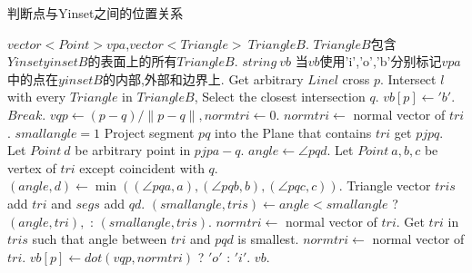 \documentclass[a4paper]{book}
\renewcommand{\algorithmicrequire}{\textbf{输入:}}
\renewcommand{\algorithmicensure}{\textbf{输出:}}
\renewcommand{\algorithmicrequire}{\textbf{Input : }}
\renewcommand{\algorithmicrequire}{\textbf{Precondition : }}
\renewcommand{\algorithmicensure}{\textbf{Output : }}
\renewcommand{\algorithmicensure}{\textbf{Postcondition : }}
\numberwithin{equation}{chapter}
\theoremstyle{definition}
\begin{document}
\begin{algorithm}
	\caption{判断点与Yinset之间的位置关系}
	\begin{algorithmic}[1]
		\renewcommand{\algorithmicrequire}{\textbf{Input : }}
		\Require $vector<Point> vpa $,$vector<Triangle>\ TriangleB$.
		\renewcommand{\algorithmicrequire}{\textbf{Precondition : }}
		\Require $TriangleB$包含$Yinset yinsetB$的表面上的所有$TriangleB$.
		\renewcommand{\algorithmicensure}{\textbf{Output : }}
		\Ensure $string\ vb$
		\renewcommand{\algorithmicensure}{\textbf{Postcondition : }}
		\Ensure 当$vb$使用'i','o','b'分别标记$vpa$中的点在$yinsetB$的内部,外部和边界上.
		\State Get arbitrary $Line l$ cross $p$.
		\State Intersect $l$ with every $Triangle$ in $TriangleB$, 
		Select the closest intersection $q$.
		\State $vb[p] \gets 'b'$.
		\State $Break$.
		\EndIf
		\State $vqp \gets (p - q)/ \lVert p - q \rVert,normtri \gets 0$.
		\State $normtri \gets$ normal vector of $tri$.
		\Else
		\State $smallangle = 1$
		\State Project segment $pq$ into the Plane that contains $tri$ get $pjpq$.
		\State Let $Point \ d$ be arbitrary point in $pjpa - q$.
		\State $angle \gets \angle pqd$.
		\Else
		\State Let $Point\ a,b,c$ be vertex of $tri$ except coincident with $q$.
		\State $(angle,d) \gets \min((\angle pqa,a), (\angle pqb,b), (\angle pqc,c))$.
		\EndIf
		\State Triangle vector $tris$ add $tri$ and $segs$ add $qd$.
		\EndIf
		\State $(smallangle,tris) \gets angle < smallangle $ ? $ (angle,tri), $ : $ (smallangle,tris)$.
		\EndFor
		\State  $normtri \gets$ normal vector of $tri$.
		\Else
		\State Get $tri$ in $tris$ such that angle between $tri$ and $pqd$ is smallest.
		\State $normtri \gets$ normal vector of $tri$.
		\EndIf
		\EndIf
		\State $vb[p] \gets dot(vqp,normtri) $ ? $ 'o' $ : $ 'i' $.
		\EndFor
		\State \Return $vb$.
		\EndFunction
	\end{algorithmic}
\end{algorithm}
\end{document}
